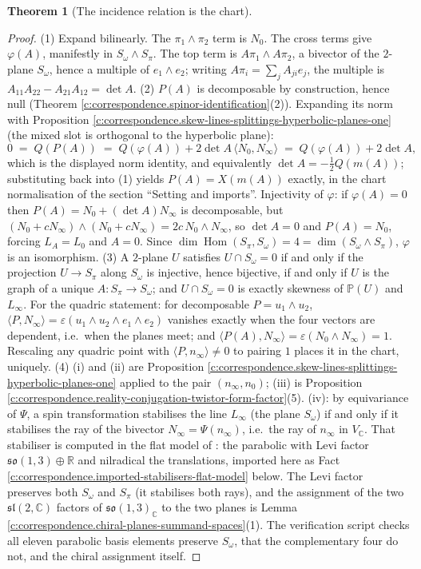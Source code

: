 \documentclass[11pt]{article}
\newtheorem{theorem}{Theorem}[section]
\theoremstyle{definition}
\theoremstyle{plain}
\providecommand{\C}{}\renewcommand{\C}{\mathbb{C}}
\providecommand{\R}{}\renewcommand{\R}{\mathbb{R}}
\providecommand{\Som}{}\renewcommand{\Som}{S_\omega}
\providecommand{\Spi}{}\renewcommand{\Spi}{S_\pi}
\providecommand{\nInf}{}\renewcommand{\nInf}{n_\infty}
\providecommand{\nO}{}\renewcommand{\nO}{n_0}
\providecommand{\ip}{}\renewcommand{\ip}[2]{\langle #1, #2\rangle}
\begin{document}
\begin{theorem}[The incidence relation is the chart]
\begin{enumerate}
\end{enumerate}
\end{theorem}
\begin{proof}
(1) Expand bilinearly. The $\pi_1\wedge\pi_2$ term is $N_0$. The cross terms give $\varphi(A)$, manifestly in $\Som\wedge\Spi$. The top term is $A\pi_1\wedge A\pi_2$, a bivector of the $2$-plane $\Som$, hence a multiple of $e_1\wedge e_2$; writing $A\pi_i = \sum_j A_{ji}e_j$, the multiple is $A_{11}A_{22} - A_{21}A_{12} = \det A$.
(2) $P(A)$ is decomposable by construction, hence null (Theorem \ref{c:correspondence.spinor-identification}(2)). Expanding its norm with Proposition \ref{c:correspondence.skew-lines-splittings-hyperbolic-planes-one} (the mixed slot is orthogonal to the hyperbolic plane):
\[
0 \;=\; Q(P(A)) \;=\; Q(\varphi(A)) + 2\det A\,\ip{N_0}{N_\infty}
 \;=\; Q(\varphi(A)) + 2\det A ,
\]
which is the displayed norm identity, and equivalently $\det A = -\tfrac12Q(m(A))$; substituting back into (1) yields $P(A) = X(m(A))$ exactly, in the chart normalisation of the section ``Setting and imports''. Injectivity of $\varphi$: if $\varphi(A) = 0$ then $P(A) = N_0 + (\det A)N_\infty$ is decomposable, but $(N_0 + cN_\infty)\wedge(N_0 + cN_\infty) = 2c\,N_0\wedge N_\infty$, so $\det A = 0$ and $P(A) = N_0$, forcing $L_A = L_0$ and $A = 0$. Since $\dim \operatorname{Hom}(\Spi,\Som) = 4 = \dim(\Som\wedge\Spi)$, $\varphi$ is an isomorphism.
(3) A $2$-plane $U$ satisfies $U \cap \Som = 0$ if and only if the projection $U \to \Spi$ along $\Som$ is injective, hence bijective, if and only if $U$ is the graph of a unique $A: \Spi \to \Som$; and $U \cap \Som = 0$ is exactly skewness of $\mathbb{P}(U)$ and $L_\infty$. For the quadric statement: for decomposable $P = u_1\wedge u_2$, $\ip{P}{N_\infty} = \varepsilon(u_1\wedge u_2\wedge e_1\wedge e_2)$ vanishes exactly when the four vectors are dependent, i.e.\ when the planes meet; and $\ip{P(A)}{N_\infty} = \varepsilon(N_0\wedge N_\infty) = 1$. Rescaling any quadric point with $\ip{P}{\nInf} \neq 0$ to pairing $1$ places it in the chart, uniquely.
(4) (i) and (ii) are Proposition \ref{c:correspondence.skew-lines-splittings-hyperbolic-planes-one} applied to the pair $(\nInf, \nO)$; (iii) is Proposition \ref{c:correspondence.reality-conjugation-twistor-form-factor}(5). (iv): by equivariance of $\Psi$, a spin transformation stabilises the line $L_\infty$ (the plane $\Som$) if and only if it stabilises the ray of the bivector $N_\infty = \Psi(\nInf)$, i.e.\ the ray of $\nInf$ in $V_\C$. That stabiliser is computed in the flat model of \cite{ButlerT6}: the parabolic with Levi factor $\mathfrak{so}(1,3)\oplus\R$ and nilradical the translations, imported here as Fact \ref{c:correspondence.imported-stabilisers-flat-model} below. The Levi factor preserves both $\Som$ and $\Spi$ (it stabilises both rays), and the assignment of the two $\mathfrak{sl}(2,\C)$ factors of $\mathfrak{so}(1,3)_\C$ to the two planes is Lemma \ref{c:correspondence.chiral-planes-summand-spaces}(1). The verification script checks all eleven parabolic basis elements preserve $\Som$, that the complementary four do not, and the chiral assignment itself.

\end{proof}
\end{document}
